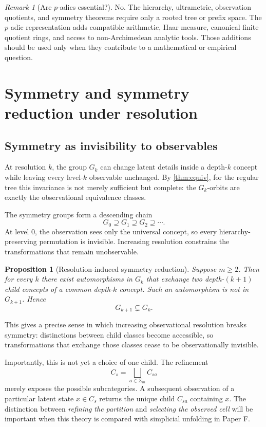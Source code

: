 \documentclass[11pt]{article}
\newtheorem{proposition}[theorem]{Proposition}
\theoremstyle{definition}
\theoremstyle{remark}
\newtheorem{remark}[theorem]{Remark}
\newcommand{\cyl}[1]{C_{#1}}
\begin{document}
\begin{remark}[Are $p$-adics essential?]
No.  The hierarchy, ultrametric, observation quotients, and symmetry theorems require only a rooted tree or prefix space.  The $p$-adic representation adds compatible arithmetic, Haar measure, canonical finite quotient rings, and access to non-Archimedean analytic tools.  Those additions should be used only when they contribute to a mathematical or empirical question.
\end{remark}

\section{Symmetry and symmetry reduction under resolution}

\subsection{Symmetry as invisibility to observables}

At resolution $k$, the group $G_k$ can change latent details inside a depth-$k$ concept while leaving every level-$k$ observable unchanged.  By \cref{thm:equiv}, for the regular tree this invariance is not merely sufficient but complete: the $G_k$-orbits are exactly the observational equivalence classes.

The symmetry groups form a descending chain
\[
G_0\supseteq G_1\supseteq G_2\supseteq\cdots.
\]
At level $0$, the observation sees only the universal concept, so every hierarchy-preserving permutation is invisible.  Increasing resolution constrains the transformations that remain unobservable.

\begin{proposition}[Resolution-induced symmetry reduction]\label{prop:symbreak}
Suppose $m\ge2$.  Then for every $k$ there exist automorphisms in $G_k$ that exchange two depth-$(k+1)$ child concepts of a common depth-$k$ concept.  Such an automorphism is not in $G_{k+1}$.  Hence
\[
G_{k+1}\subsetneq G_k.
\]
\end{proposition}

This gives a precise sense in which increasing observational resolution breaks symmetry: distinctions between child classes become accessible, so transformations that exchange those classes cease to be observationally invisible.

Importantly, this is not yet a choice of one child.  The refinement
\[
\cyl{s}=\bigsqcup_{a\in\Sigma_m}\cyl{sa}
\]
merely exposes the possible subcategories.  A subsequent observation of a particular latent state $x\in\cyl{s}$ returns the unique child $\cyl{sa}$ containing $x$.  The distinction between \emph{refining the partition} and \emph{selecting the observed cell} will be important when this theory is compared with simplicial unfolding in Paper F.
\end{document}
